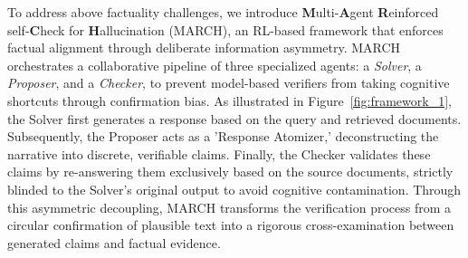 \documentclass[10pt, a4paper, logo]{googledeepmind} %
\begin{document}
To address above factuality challenges, we introduce \textbf{M}ulti-\textbf{A}gent \textbf{R}einforced self-\textbf{C}heck for \textbf{H}allucination (MARCH), an RL-based framework that enforces factual alignment through deliberate information asymmetry. 
MARCH orchestrates a collaborative pipeline of three specialized agents: a \textit{Solver}, a \textit{Proposer}, and a \textit{Checker}, to prevent model-based verifiers from taking cognitive shortcuts through confirmation bias.
%
%
As illustrated in Figure~\ref{fig:framework_1}, the Solver first generates a response based on the query and retrieved documents. Subsequently, the Proposer acts as a 'Response Atomizer,' deconstructing the narrative into discrete, verifiable claims. Finally, the Checker validates these claims by re-answering them exclusively based on the source documents, strictly blinded to the Solver’s original output to avoid cognitive contamination. Through this asymmetric decoupling, MARCH transforms the verification process from a circular confirmation of plausible text into a rigorous cross-examination between generated claims and factual evidence.
%
%
\end{document}
